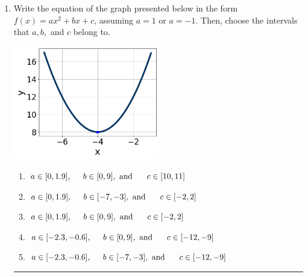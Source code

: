 \documentclass[14pt]{extbook}
\newcommand{\litem}[1]{\item#1\hspace*{-1cm}\rule{\textwidth}{0.4pt}}
\begin{document}
\begin{enumerate}
\litem{
Write the equation of the graph presented below in the form $f(x)=ax^2+bx+c$, assuming  $a=1$ or $a=-1$. Then, choose the intervals that $a, b,$ and $c$ belong to.
\begin{center}
    \includegraphics[width=0.5\textwidth]{../Figures/quadraticGraphToEquationCopyC.png}
\end{center}
\begin{enumerate}[label=\Alph*.]
\item \( a \in [0, 1.9], \hspace*{5mm} b \in [0, 9], \text{ and } \hspace*{5mm} c \in [10, 11] \)
\item \( a \in [0, 1.9], \hspace*{5mm} b \in [-7, -3], \text{ and } \hspace*{5mm} c \in [-2, 2] \)
\item \( a \in [0, 1.9], \hspace*{5mm} b \in [0, 9], \text{ and } \hspace*{5mm} c \in [-2, 2] \)
\item \( a \in [-2.3, -0.6], \hspace*{5mm} b \in [0, 9], \text{ and } \hspace*{5mm} c \in [-12, -9] \)
\item \( a \in [-2.3, -0.6], \hspace*{5mm} b \in [-7, -3], \text{ and } \hspace*{5mm} c \in [-12, -9] \)


\end{enumerate}}
\end{enumerate}
\end{document}

